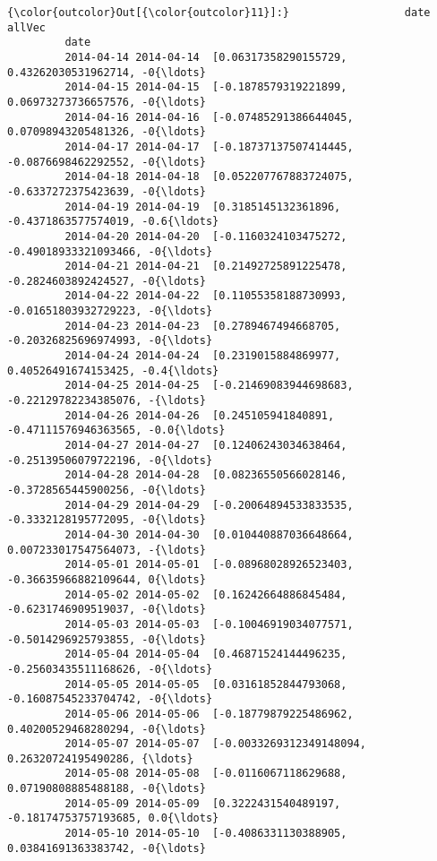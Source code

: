 \documentclass[11pt]{article}
\begin{document}
\begin{Verbatim}[commandchars=\\\{\}]
{\color{outcolor}Out[{\color{outcolor}11}]:}                  date                                             allVec
         date                                                                    
         2014-04-14 2014-04-14  [0.06317358290155729, 0.43262030531962714, -0{\ldots}
         2014-04-15 2014-04-15  [-0.1878579319221899, 0.06973273736657576, -0{\ldots}
         2014-04-16 2014-04-16  [-0.07485291386644045, 0.07098943205481326, -0{\ldots}
         2014-04-17 2014-04-17  [-0.18737137507414445, -0.0876698462292552, -0{\ldots}
         2014-04-18 2014-04-18  [0.052207767883724075, -0.6337272375423639, -0{\ldots}
         2014-04-19 2014-04-19  [0.3185145132361896, -0.4371863577574019, -0.6{\ldots}
         2014-04-20 2014-04-20  [-0.1160324103475272, -0.49018933321093466, -0{\ldots}
         2014-04-21 2014-04-21  [0.21492725891225478, -0.2824603892424527, -0{\ldots}
         2014-04-22 2014-04-22  [0.11055358188730993, -0.01651803932729223, -0{\ldots}
         2014-04-23 2014-04-23  [0.2789467494668705, -0.20326825696974993, -0{\ldots}
         2014-04-24 2014-04-24  [0.2319015884869977, 0.40526491674153425, -0.4{\ldots}
         2014-04-25 2014-04-25  [-0.21469083944698683, -0.22129782234385076, -{\ldots}
         2014-04-26 2014-04-26  [0.245105941840891, -0.47111576946363565, -0.0{\ldots}
         2014-04-27 2014-04-27  [0.12406243034638464, -0.25139506079722196, -0{\ldots}
         2014-04-28 2014-04-28  [0.08236550566028146, -0.3728565445900256, -0{\ldots}
         2014-04-29 2014-04-29  [-0.20064894533833535, -0.3332128195772095, -0{\ldots}
         2014-04-30 2014-04-30  [0.010440887036648664, 0.007233017547564073, -{\ldots}
         2014-05-01 2014-05-01  [-0.08968028926523403, -0.36635966882109644, 0{\ldots}
         2014-05-02 2014-05-02  [0.16242664886845484, -0.6231746909519037, -0{\ldots}
         2014-05-03 2014-05-03  [-0.10046919034077571, -0.5014296925793855, -0{\ldots}
         2014-05-04 2014-05-04  [0.46871524144496235, -0.25603435511168626, -0{\ldots}
         2014-05-05 2014-05-05  [0.03161852844793068, -0.16087545233704742, -0{\ldots}
         2014-05-06 2014-05-06  [-0.18779879225486962, 0.40200529468280294, -0{\ldots}
         2014-05-07 2014-05-07  [-0.0033269312349148094, 0.26320724195490286, {\ldots}
         2014-05-08 2014-05-08  [-0.0116067118629688, 0.07190808885488188, -0{\ldots}
         2014-05-09 2014-05-09  [0.3222431540489197, -0.18174753757193685, 0.0{\ldots}
         2014-05-10 2014-05-10  [-0.4086331130388905, 0.03841691363383742, -0{\ldots}

\end{Verbatim}
\end{document}
